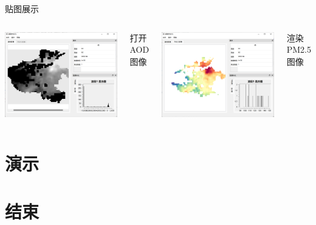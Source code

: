 \documentclass{ctexbeamer}
\begin{document}
\begin{frame}{贴图展示}
	\begin{columns}
		\includegraphics[width=\columnwidth]{getPM2.5程序-打开AOD图像}
		\begin{center}
			打开AOD图像
		\end{center}
		\includegraphics[width=\columnwidth]{getPM2.5程序-渲染PM2.5图像}
		\begin{center}
			渲染PM2.5图像
		\end{center}
	\end{columns}
\end{frame}
\section{演示}
\section{结束}
\end{document}
